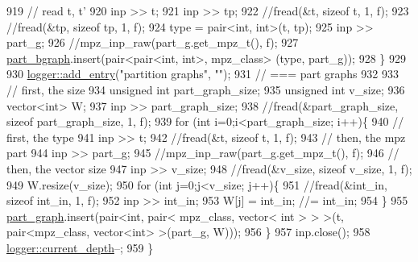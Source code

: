 \begin{DoxyCode}
919     \textcolor{comment}{// read t, t'}
920     inp >> t;
921     inp >> tp;
922     \textcolor{comment}{//fread(&t, sizeof t, 1, f);}
923     \textcolor{comment}{//fread(&tp, sizeof tp, 1, f);}
924     type = pair<int, int>(t, tp);
925     inp >> part\_g;
926     \textcolor{comment}{//mpz\_inp\_raw(part\_g.get\_mpz\_t(), f);}
927     \hyperlink{classmarked__graph__compressed_a7b3267063fba30b45eb21b3ba4e07536}{part\_bgraph}.insert(pair<pair<int, int>, mpz\_class> (type, part\_g));
928   \}
929 
930   \hyperlink{classlogger_a710163deb17bc81f70d53d285b8ac9ac}{logger::add\_entry}(\textcolor{stringliteral}{"partition graphs"}, \textcolor{stringliteral}{""});
931   \textcolor{comment}{// === part graphs}
932 
933   \textcolor{comment}{// first, the size}
934   \textcolor{keywordtype}{unsigned} \textcolor{keywordtype}{int} part\_graph\_size;
935   \textcolor{keywordtype}{unsigned} \textcolor{keywordtype}{int} v\_size;
936   vector<int> W; 
937   inp >> part\_graph\_size;
938   \textcolor{comment}{//fread(&part\_graph\_size, sizeof part\_graph\_size, 1, f);}
939   \textcolor{keywordflow}{for} (\textcolor{keywordtype}{int} i=0;i<part\_graph\_size; i++)\{
940     \textcolor{comment}{// first, the type}
941     inp >> t; 
942     \textcolor{comment}{//fread(&t, sizeof t, 1, f);}
943     \textcolor{comment}{// then, the mpz part}
944     inp >> part\_g;
945     \textcolor{comment}{//mpz\_inp\_raw(part\_g.get\_mpz\_t(), f);}
946     \textcolor{comment}{// then, the vector size}
947     inp >> v\_size;
948     \textcolor{comment}{//fread(&v\_size, sizeof v\_size, 1, f);}
949     W.resize(v\_size);
950     \textcolor{keywordflow}{for} (\textcolor{keywordtype}{int} j=0;j<v\_size; j++)\{
951       \textcolor{comment}{//fread(&int\_in, sizeof int\_in, 1, f);}
952       inp >> int\_in;
953       W[j] = int\_in; \textcolor{comment}{//= int\_in;}
954     \}
955     \hyperlink{classmarked__graph__compressed_ae179a4737e6eab905c18a94d44ef64b7}{part\_graph}.insert(pair<\textcolor{keywordtype}{int}, pair< mpz\_class, vector< int > > >(t, pair<mpz\_class, vector<int>
       >(part\_g, W)));
956   \}
957   inp.close();
958   \hyperlink{classlogger_a9d29b49bd318a719a8e85b59eac54fe0}{logger::current\_depth}--;
959 \}
\end{DoxyCode}
\mbox{\label{classmarked__graph__compressed_ab9cdb7fc43badd58fb5202f74ffac723}} 
